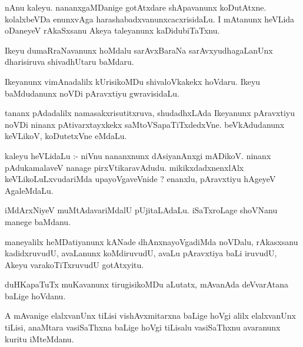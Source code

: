 \documentclass{article}
\begin{document}
\begin{mn}
nAnu  kaleyu.  nananxgaMDanige  gotAtxdare  shApavanunx  koDutAtxne.  kolalxbeVDa  enunxvAga  
harashabadxvanunxcacxrisidaLu.  I  mAtanunx  heVLida  oDaneyeV  rAkaSxsanu  Akeya  taleyanunx  kaDidubiTaTxnu.
\end{mn}

\begin{mn}
Ikeyu  dumaRraNavanunx  hoMdalu  sarAvxBaraNa  sarAvxyudhagaLanUnx  dharisiruva  shivadhUtaru  baMdaru.
\end{mn}

\begin{mn}
Ikeyanunx  vimAnadalilx  kUrisikoMDu  shivaloVkakekx  hoVdaru.  Ikeyu  baMdudanunx  noVDi  
pAravxtiyu  gwravisidaLu.
\end{mn}

\begin{mn}
tananx  pAdadalilx  namasakxrisutitxruva,  shudadhxLAda  Ikeyanunx  pAravxtiyu  noVDi  ninanx  
pAtivarxtayxkekx  saMtoVSapaTiTxdedxVne.  beVkAdudanunx  keVLikoV,  koDutetxVne  eMdaLu.
\end{mn}

\begin{mn}
kaleyu  heVLidaLu :- niVnu  nananxnunx  dAsiyanAnxgi  mADikoV.  ninanx  pAdukamalaveV  nanage  pirxVtikaravAdudu.  
mikikxdadxnenxlAlx  keVLikoLuLxvudariMda  upayoVgaveVnide ?  enanxlu,  pAravxtiyu  hAgeyeV  AgaleMdaLu.
\end{mn}

\begin{mn}
iMdArxNiyeV  muMtAdavariMdalU  pUjitaLAdaLu.  iSaTxroLage  shoVNanu  manege  baMdanu.
\end{mn}

\begin{mn}
maneyalilx  heMDatiyanunx  kANade  dhAnxnayoVgadiMda  noVDalu,  rAkasxsanu  kadidxruvudU,  avaLanunx  
koMdiruvudU,  avaLu  pAravxtiya  baLi  iruvudU,  Akeyu  varakoTiTxruvudU  gotAtxyitu.
\end{mn}

\begin{mn}
duHKapaTuTx  muKavanunx  tirugisikoMDu  aLutatx,  mAvanAda  deVvarAtana  baLige  hoVdanu.
\end{mn}

\begin{mn}
A  mAvanige  elalxvanUnx  tiLisi  vishAvxmitarxna  baLige  hoVgi  alilx  elalxvanUnx  tiLisi,  
anaMtara  vasiSaThxna  baLige  hoVgi  tiLisalu  vasiSaThxnu  avaranunx  kuritu  iMteMdanu.
\end{mn}
\end{document}
